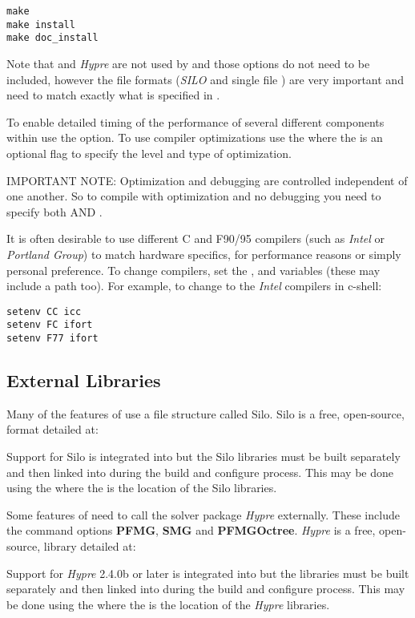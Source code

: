 \begin{enumerate}
\begin{display}
\begin{verbatim}
make 
make install
make doc_install
\end{verbatim}\end{display}

Note that  and \emph{Hypre} are not used by  and
those options do not need to be included, however the file formats (\emph{SILO} 
and single file ) are very important and need to match exactly what is
specified in .

To enable detailed timing of the performance of several different
components within \parflow{} use the  option.
To use compiler optimizations use the  where
the  is an optional flag to specify the level and type
of optimization.

IMPORTANT NOTE: Optimization and debugging are controlled independent of one
another.  So to compile with optimization and no debugging you need to
specify both  AND .

It is often desirable to use different C and F90/95 compilers 
(such as \emph{Intel} or \emph{Portland Group}) to match hardware specifics,
for performance reasons or simply personal preference.  To change compilers,
set the ,  and  variables (these may include a path too). 
For example, to change to the \emph{Intel} compilers in c-shell:
\begin{display}\begin{verbatim}
setenv CC icc
setenv FC ifort
setenv F77 ifort
\end{verbatim}\end{display}
\end{enumerate}

\subsection{External Libraries}
\label{External Libraries}
Many of the features of \parflow{} use a file structure called Silo.  
Silo is a free, open-source, format detailed at:
\begin{center}
\end{center}
Support for Silo is integrated into \parflow{} but the Silo libraries 
must be built separately and then linked into \parflow{} during the 
build and configure process.   This may be done using the  
where the  is the location of the Silo libraries.

Some features of \parflow{} need to call the solver package \emph{Hypre} externally.  
These include the command options {\bf PFMG}, {\bf SMG} and  {\bf PFMGOctree}. \emph{Hypre} is a
free, open-source, library detailed at:
\begin{center}
\end{center}
Support for \emph{Hypre} 2.4.0b or later is integrated into \parflow{} but the libraries
must be built separately and then linked into \parflow{} during the build and configure process. 
This may be done using the  where the  is the location of the
\emph{Hypre} libraries.
